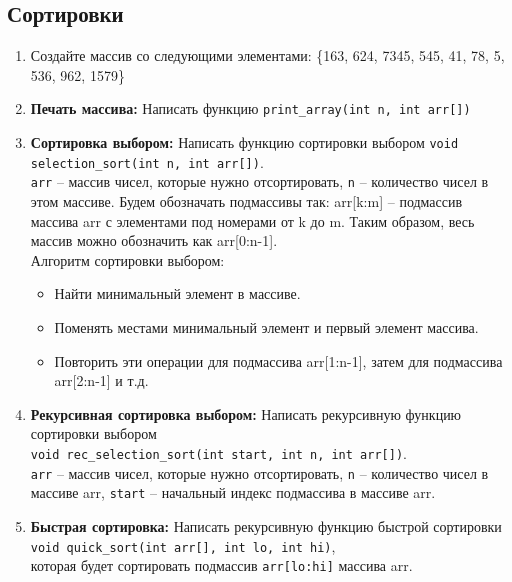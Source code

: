\documentclass{article}
\begin{document}
\subsection*{Сортировки}
\begin{enumerate}
\item Создайте массив со следующими элементами: \{163, 624, 7345, 545, 41, 78, 5, 536, 962, 1579\}
\item \textbf{Печать массива:} Написать функцию \texttt{print\_array(int n, int arr[])}
\item \textbf{Сортировка выбором:} Написать функцию сортировки выбором \texttt{void selection\_sort(int n, int arr[])}.\\
\texttt{arr} -- массив чисел, которые нужно отсортировать, \texttt{n} -- количество чисел в этом массиве.
Будем обозначать подмассивы так: arr[k:m] -- подмассив массива arr с элементами под номерами от k до m. Таким образом, весь массив можно обозначить как arr[0:n-1]. \\

Алгоритм сортировки выбором:
\begin{itemize}
\item Найти минимальный элемент в массиве.
\item Поменять местами минимальный элемент и первый элемент массива.
\item Повторить эти операции для подмассива arr[1:n-1], затем для подмассива arr[2:n-1] и т.д.
\end{itemize}
\item \textbf{Рекурсивная сортировка выбором:} Написать рекурсивную функцию сортировки выбором \\
\texttt{void rec\_selection\_sort(int start, int n, int arr[])}.\\
\texttt{arr} -- массив чисел, которые нужно отсортировать, 
\texttt{n} -- количество чисел в массиве arr,
\texttt{start} -- начальный индекс подмассива в массиве arr.\\
\item \textbf{Быстрая сортировка:} Написать рекурсивную функцию быстрой сортировки\\ \texttt{void quick\_sort(int arr[], int lo, int hi)},\\
которая будет сортировать подмассив \texttt{arr[lo:hi]} массива arr.


\end{enumerate}
\end{document}
